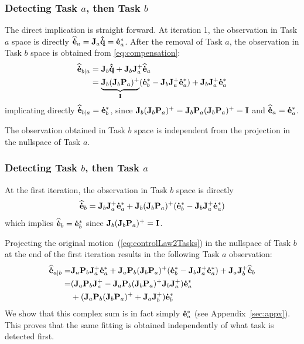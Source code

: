 \documentclass[journal]{IEEEtran}
\begin{document}
  \subsubsection{Detecting Task $a$, then Task $b$}
The direct implication is straight forward.
At iteration 1, the observation in Task $a$ space is directly
${\mathbf{\widehat{\dot{e}}}}_{a} = {\mathbf{J}}_a{\mathbf{\hat{\dot{q}}}} = {\mathbf{\dot{e}}}_{a}^*$.  
After the removal of Task $a$, the observation in Task $b$ space
is obtained from \eqref{eq:compensation}:
\begin{align*}
 {\mathbf{\widehat{\dot{e}}}}_{b|a} &=  {\mathbf{J}}_b{\mathbf{\hat{\dot{q}}}} +  {\mathbf{J}}_b {\mathbf{J}}_a^+ {\mathbf{\widehat{\dot{e}}}}_{a}\\
 &= \underbrace{{\mathbf{J}}_b({\mathbf{J}}_b {\mathbf{P}}_a)^+}_{{\mathbf{I}}} ({\mathbf{\dot{e}}}_{b}^* - {\mathbf{J}}_b {\mathbf{J}}_a^+{\mathbf{\dot{e}}}_{a}^*) + {\mathbf{J}}_b {\mathbf{J}}_a^+ {\mathbf{\dot{e}}}_{a}^*
\end{align*}
implicating directly ${\mathbf{\widehat{\dot{e}}}}_{b|a}={\mathbf{\dot{e}}}_{b}^*$, since ${\mathbf{J}}_b({\mathbf{J}}_b {\mathbf{P}}_a)^+ = {\mathbf{J}}_b {\mathbf{P}}_a({\mathbf{J}}_b {\mathbf{P}}_a)^+ = {\mathbf{I}}$ and ${\mathbf{\widehat{\dot{e}}}}_{a} = {\mathbf{\dot{e}}}_{a}^*$.

The observation obtained in Task $b$ space is independent from the
projection in the nullspace of Task $a$.\\

\subsubsection{Detecting Task $b$, then Task $a$}

At the first iteration, the observation in Task $b$ space is directly
\begin{equation*}
{\mathbf{\widehat{\dot{e}}}}_{b}  = {\mathbf{J}}_{b} {\mathbf{J}}_{a}^+ {\mathbf{\dot{e}}}_{a}^* + {\mathbf{J}}_{b} ( {\mathbf{J}}_{b} {\mathbf{P}}_{a} )^+ ( {\mathbf{\dot{e}}}_{b}^* - {\mathbf{J}}_{b} {\mathbf{J}}_{a}^+ {\mathbf{\dot{e}}}_{a}^* )
\end{equation*}
which implies ${\mathbf{\widehat{\dot{e}}}}_{b} = {\mathbf{\dot{e}}}_{b}^*$ since ${\mathbf{J}}_{b} ( {\mathbf{J}}_{b} {\mathbf{P}}_{a} )^+ = {\mathbf{I}}$.

Projecting the original motion~(\ref{eq:controlLaw2Tasks}) in the nullspace of Task $b$ at the
end of the first iteration results in the following Task $a$ observation:
\begin{align*}
{\mathbf{\widehat{\dot{e}}}}_{a|b} =& {\mathbf{J}}_{a} {\mathbf{P}}_{b} {\mathbf{J}}_{a}^+ {\mathbf{\dot{e}}}_{a}^* +
 {\mathbf{J}}_{a} {\mathbf{P}}_{b} ({\mathbf{J}}_{b} {\mathbf{P}}_{a} )^+ ( {\mathbf{\dot{e}}}_{b}^* - {\mathbf{J}}_{b} {\mathbf{J}}_{a}^+ {\mathbf{\dot{e}}}_{a}^*)
+ {\mathbf{J}}_{a} {\mathbf{J}}_{b}^+ {\mathbf{\widehat{\dot{e}}}}_{b} \\
=& ({\mathbf{J}}_{a} {\mathbf{P}}_{b} {\mathbf{J}}_{a}^+ - {\mathbf{J}}_{a} {\mathbf{P}}_{b} ({\mathbf{J}}_{b} {\mathbf{P}}_{a} )^+ {\mathbf{J}}_{b} {\mathbf{J}}_{a}^+) {\mathbf{\dot{e}}}_{a}^* \\
&+ ({\mathbf{J}}_{a} {\mathbf{P}}_{b} ({\mathbf{J}}_{b} {\mathbf{P}}_{a} )^+ + {\mathbf{J}}_{a} {\mathbf{J}}_{b}^+) {\mathbf{\dot{e}}}_{b}^*
\end{align*}
We show that this complex sum is in fact simply ${\mathbf{\dot{e}}}_{a}^*$ (see Appendix~\ref{sec:appx}).
%
This proves that the same fitting is obtained independently of what task is
detected first. \QED 
\end{document}
